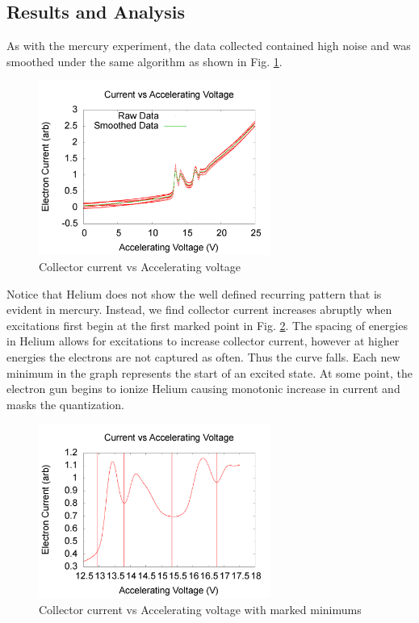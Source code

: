 \documentclass[12pt,twocolumn]{article}
\begin{document}
\subsection{Results and Analysis}

As with the mercury experiment, the data collected contained high noise and was smoothed under the same algorithm as shown in Fig. \ref{fig:HeData}.

\begin{figure}[h!]
	\centering
	\includegraphics[width=3in]{images/He-smoothed}
	\caption{Collector current vs Accelerating voltage}
	\label{fig:HeData}
\end{figure}

Notice that Helium does not show the well defined recurring pattern that is evident in mercury. Instead, we find collector current increases abruptly when excitations first begin at the first marked point in Fig. \ref{fig:HeMark}. The spacing of energies in Helium allows for excitations to increase collector current, however at higher energies the electrons are not captured as often. Thus the curve falls. Each new minimum in the graph represents the start of an excited state. At some point, the electron gun begins to ionize Helium causing monotonic increase in current and masks the quantization.

\begin{figure}[h!]
	\centering
	\includegraphics[width=3in]{images/HeMark}
	\caption{Collector current vs Accelerating voltage with marked minimums}
	\label{fig:HeMark}
\end{figure}
\end{document}
